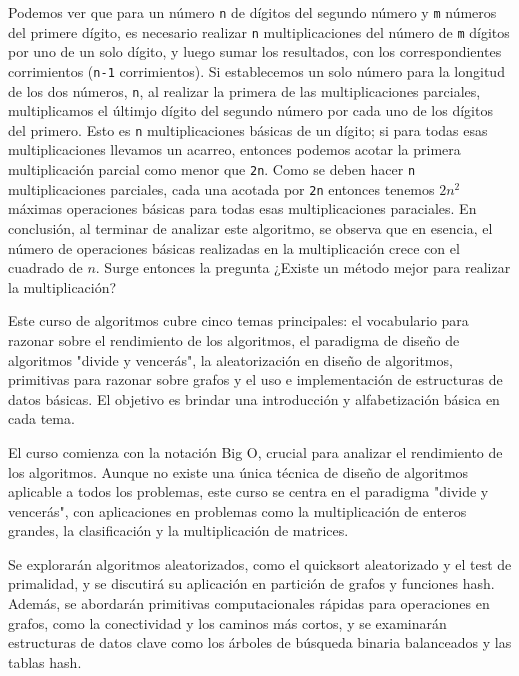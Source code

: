             Podemos ver que para un número \texttt{n} de dígitos del segundo número y \texttt{m} números del primere dígito, es necesario realizar \texttt{n} multiplicaciones del número de \texttt{m} dígitos por uno de un solo dígito, y luego sumar los resultados, con los correspondientes corrimientos (\texttt{n-1} corrimientos). Si establecemos un solo número para la longitud de los dos números, \texttt{n}, al realizar la primera de las multiplicaciones parciales, multiplicamos el últimjo dígito del segundo número por cada uno de los dígitos del primero. Esto es \texttt{n} multiplicaciones básicas de un dígito; si para todas esas multiplicaciones llevamos un acarreo, entonces podemos acotar la primera multiplicación parcial como menor que \texttt{2n}. Como se deben hacer \texttt{n} multiplicaciones parciales, cada una acotada por \texttt{2n} entonces tenemos $2n^2$ máximas operaciones básicas para todas esas multiplicaciones paraciales. En conclusión, al terminar de analizar este algoritmo, se observa que en esencia, el número de operaciones básicas realizadas en la multiplicación crece con el cuadrado de $n$. Surge entonces la pregunta ¿Existe un método mejor para realizar la multiplicación?
            
            Este curso de algoritmos cubre cinco temas principales: el vocabulario para razonar sobre el rendimiento de los algoritmos, el paradigma de diseño de algoritmos "divide y vencerás", la aleatorización en diseño de algoritmos, primitivas para razonar sobre grafos y el uso e implementación de estructuras de datos básicas. El objetivo es brindar una introducción y alfabetización básica en cada tema.

            El curso comienza con la notación Big O, crucial para analizar el rendimiento de los algoritmos. Aunque no existe una única técnica de diseño de algoritmos aplicable a todos los problemas, este curso se centra en el paradigma "divide y vencerás", con aplicaciones en problemas como la multiplicación de enteros grandes, la clasificación y la multiplicación de matrices.
                
            Se explorarán algoritmos aleatorizados, como el quicksort aleatorizado y el test de primalidad, y se discutirá su aplicación en partición de grafos y funciones hash. Además, se abordarán primitivas computacionales rápidas para operaciones en grafos, como la conectividad y los caminos más cortos, y se examinarán estructuras de datos clave como los árboles de búsqueda binaria balanceados y las tablas hash.
                
